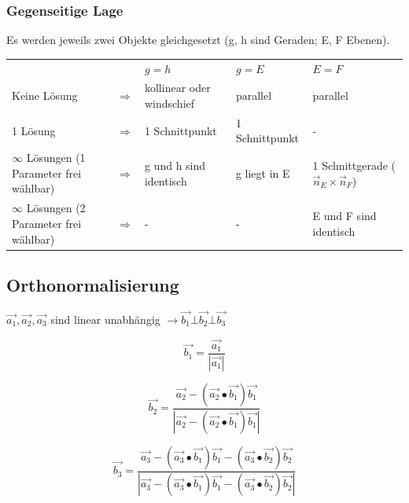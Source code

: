	\subsubsection{Gegenseitige Lage}
		Es werden jeweils zwei Objekte gleichgesetzt (g, h sind Geraden; E, F
		Ebenen).\\
		\begin{tabular}{lllll}
			&&$g = h$ &$g = E$ &$E = F$\\
			Keine Lösung &$\Rightarrow$ &kollinear oder windschief &parallel
			&parallel\\
			1 Lösung &$\Rightarrow$ &1 Schnittpunkt &1 Schnittpunkt & - \\
			$\infty$ Lösungen (1 Parameter frei wählbar) &$\Rightarrow$ 
			&g und h sind identisch &g liegt in E &1 Schnittgerade ($\vec{n}_E \times \vec{n}_F$) \\
			$\infty$ Lösungen (2 Parameter frei wählbar) &$\Rightarrow$  
			& - & - &E und F sind identisch
		\end{tabular}


\subsection{Orthonormalisierung}
	$\vec{a_1}, \vec{a_2}, \vec{a_3}$ sind linear unabhängig $\longrightarrow \vec{b_1} \bot \vec{b_2} \bot \vec{b_3}$\\
	\begin{minipage}{3cm}
		\begin{equation*}
			\vec{b_1} = \frac{\vec{a_1}}{|\vec{a_1}|}
		\end{equation*}
	\end{minipage}
	\begin{minipage}{5cm}
		\begin{equation*}
			\vec{b_2} = \frac{\vec{a_2} - (\vec{a_2} \bullet \vec{b_1}) \vec{b_1}}{|\vec{a_2} - (\vec{a_2} \bullet \vec{b_1}) \vec{b_1}|}
		\end{equation*}
	\end{minipage}
	\begin{minipage}{5cm}
		\begin{equation*}
			\vec{b_3} = \frac{\vec{a_3} - (\vec{a_3} \bullet \vec{b_1})\vec{b_1} - (\vec{a_3} \bullet \vec{b_2})\vec{b_2}}
					{|\vec{a_3} - (\vec{a_3} \bullet \vec{b_1})\vec{b_1} - (\vec{a_3} \bullet \vec{b_2})\vec{b_2}|}
		\end{equation*}
	\end{minipage} \\ \ \\
	
